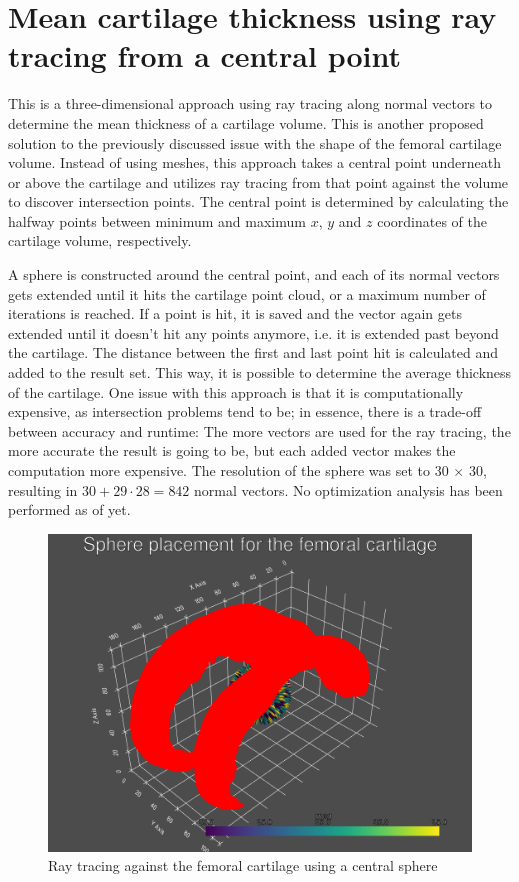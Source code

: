 \section{Mean cartilage thickness using ray tracing from a central point}
\label{sec:Raytracing}
This is a three-dimensional approach using ray tracing along normal vectors to determine the mean thickness of a cartilage volume. This is another proposed solution to the previously discussed issue with the shape of the femoral cartilage volume. Instead of using meshes, this approach takes a central point underneath or above the cartilage and utilizes ray tracing from that point against the volume to discover intersection points. The central point is determined by calculating the halfway points between minimum and maximum $x$, $y$ and $z$ coordinates of the cartilage volume, respectively.
\par
A sphere is constructed around the central point, and each of its normal vectors gets extended until it hits the cartilage point cloud, or a maximum number of iterations is reached. If a point is hit, it is saved and the vector again gets extended until it doesn't hit any points anymore, i.e. it is extended past beyond the cartilage. The distance between the first and last point hit is calculated and added to the result set. This way, it is possible to determine the average thickness of the cartilage. One issue with this approach is that it is computationally expensive, as intersection problems tend to be; in essence, there is a trade-off between accuracy and runtime: The more vectors are used for the ray tracing, the more accurate the result is going to be, but each added vector makes the computation more expensive. The resolution of the sphere was set to 30 $\times$ 30, resulting in $30 + 29 \cdot 28 = 842$ normal vectors. No optimization analysis has been performed as of yet.

\begin{figure}[htb!]
	\centering
	\includegraphics[width=\linewidth]{./figures/femoral_sphere}
	\caption{Ray tracing against the femoral cartilage using a central sphere}
	\label{fig:femoral_sphere}
\end{figure}

